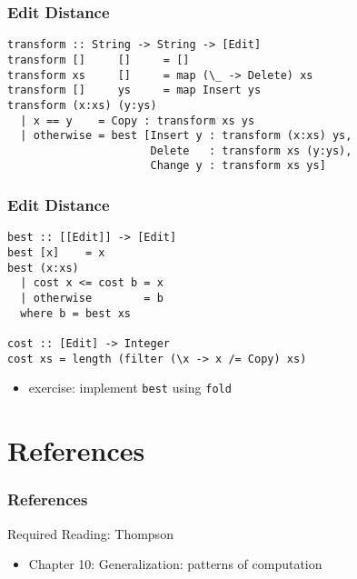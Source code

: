 \documentclass[dvipsnames]{beamer}
\theoremstyle{plain}
\begin{document}
\begin{frame}[fragile]
  \frametitle{Edit Distance}

  \begin{exampleblock}{}
    \begin{lstlisting}
transform :: String -> String -> [Edit]
transform []     []     = []
transform xs     []     = map (\_ -> Delete) xs
transform []     ys     = map Insert ys
transform (x:xs) (y:ys)
  | x == y    = Copy : transform xs ys
  | otherwise = best [Insert y : transform (x:xs) ys,
                      Delete   : transform xs (y:ys),
                      Change y : transform xs ys]
    \end{lstlisting}
  \end{exampleblock}
\end{frame}

\begin{frame}[fragile]
  \frametitle{Edit Distance}

  \begin{exampleblock}{}
    \begin{lstlisting}
best :: [[Edit]] -> [Edit]
best [x]    = x
best (x:xs)
  | cost x <= cost b = x
  | otherwise        = b
  where b = best xs

cost :: [Edit] -> Integer
cost xs = length (filter (\x -> x /= Copy) xs)
    \end{lstlisting}
  \end{exampleblock}

  \pause
  \begin{itemize}
    \item exercise: implement \lstinline{best} using
      \lstinline{fold}
  \end{itemize}
\end{frame}

\section*{References}

\begin{frame}
  \frametitle{References}

  \begin{block}{Required Reading: Thompson}
    \begin{itemize}
      \item Chapter 10: \alert{Generalization: patterns of computation}
    \end{itemize}
  \end{block}
\end{frame}
\end{document}
